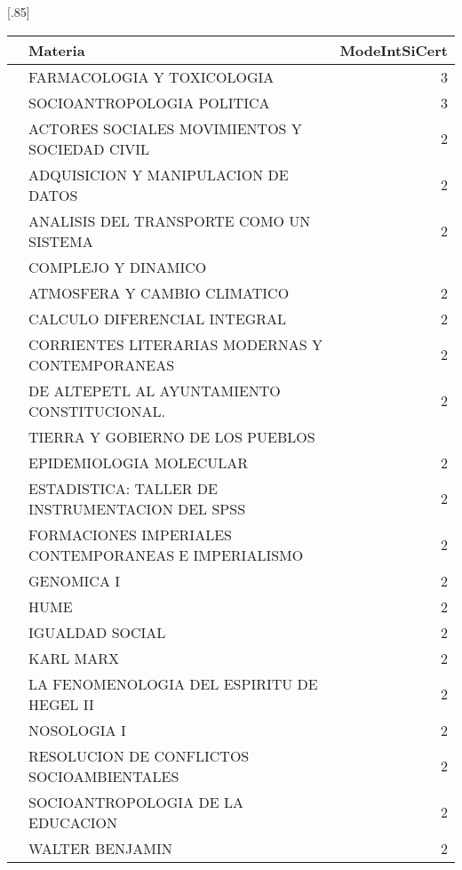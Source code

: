\documentclass[12pt]{article}
\begin{document}
\begin{table}[ht]
\centering
\scalebox{0.75}[.85]{
\begin{tabular}{rlr}
  \hline
 & Materia & ModeIntSiCert \\ 
  \hline
 & FARMACOLOGIA Y TOXICOLOGIA & 3 \\ 
 & SOCIOANTROPOLOGIA POLITICA & 3 \\ 
 & ACTORES SOCIALES MOVIMIENTOS Y SOCIEDAD CIVIL & 2 \\ 
 & ADQUISICION Y MANIPULACION DE DATOS & 2 \\ 
 & ANALISIS DEL TRANSPORTE COMO UN SISTEMA & 2 \\ 
 & COMPLEJO Y DINAMICO &  \\ 
 & ATMOSFERA Y CAMBIO CLIMATICO & 2 \\ 
 & CALCULO DIFERENCIAL INTEGRAL & 2 \\ 
 & CORRIENTES LITERARIAS MODERNAS Y CONTEMPORANEAS & 2 \\ 
 & DE ALTEPETL AL AYUNTAMIENTO CONSTITUCIONAL. & 2 \\ 
 & TIERRA Y GOBIERNO DE LOS PUEBLOS &  \\ 
 & EPIDEMIOLOGIA MOLECULAR & 2 \\ 
 & ESTADISTICA: TALLER DE INSTRUMENTACION DEL SPSS & 2 \\ 
 & FORMACIONES IMPERIALES CONTEMPORANEAS E IMPERIALISMO & 2 \\ 
 & GENOMICA I & 2 \\ 
 & HUME & 2 \\ 
 & IGUALDAD SOCIAL & 2 \\ 
 & KARL MARX & 2 \\ 
 & LA FENOMENOLOGIA DEL ESPIRITU DE HEGEL II & 2 \\ 
 & NOSOLOGIA I & 2 \\ 
 & RESOLUCION DE CONFLICTOS SOCIOAMBIENTALES & 2 \\ 
 & SOCIOANTROPOLOGIA DE LA EDUCACION & 2 \\ 
 & WALTER BENJAMIN & 2 \\ 
   \hline
\end{tabular}}
\end{table}
\end{document}
